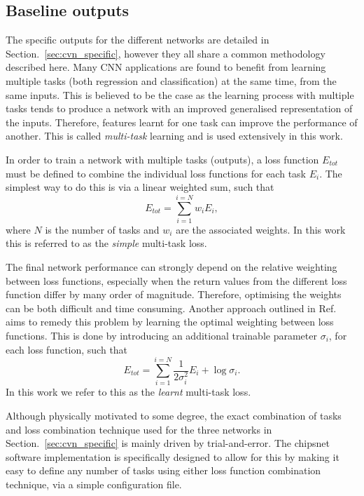 \subsection{Baseline outputs} %
\label{sec:cvn_baseline_outputs} %

The specific outputs for the different networks are detailed in Section.~\ref{sec:cvn_specific},
however they all share a common methodology described here. Many CNN applications are found to
benefit from learning multiple tasks (both regression and classification) at the same time, from
the same inputs. This is believed to be the case as the learning process with multiple tasks tends
to produce a network with an improved generalised representation of the inputs. Therefore,
features learnt for one task can improve the performance of another. This is called
\emph{multi-task} learning and is used extensively in this work.

In order to train a network with multiple tasks (outputs), a loss function $E_{tot}$ must be
defined to combine the individual loss functions for each task $E_{i}$. The simplest way to do
this is via a linear weighted sum, such that
\begin{equation}
    E_{tot} = \sum_{i=1}^{i=N}w_{i}E_{i},
    \label{eq:multi_simple}
\end{equation}
where $N$ is the number of tasks and $w_{i}$ are the associated weights. In this work this is
referred to as the \emph{simple} multi-task loss.

The final network performance can strongly depend on the relative weighting between loss
functions, especially when the return values from the different loss function differ by many order
of magnitude. Therefore, optimising the weights can be both difficult and time consuming. Another
approach outlined in Ref.~\cite{kendall2018} aims to remedy this problem by learning the optimal
weighting between loss functions. This is done by introducing an additional trainable parameter
$\sigma_{i}$, for each loss function, such that
\begin{equation}
    E_{tot}= \sum_{i=1}^{i=N}\frac{1}{2\sigma_{i}^2}E_{i}+ \log\sigma_{i}.
\end{equation}
In this work we refer to this as the \emph{learnt} multi-task loss.

Although physically motivated to some degree, the exact combination of tasks and loss combination
technique used for the three networks in Section.~\ref{sec:cvn_specific} is mainly driven by
trial-and-error. The chipsnet software implementation is specifically designed to allow for this
by making it easy to define any number of tasks using either loss function combination technique,
via a simple configuration file.

